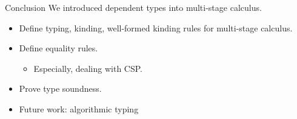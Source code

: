 \documentclass[dvipdfmx,aspectratio=169, 20pt]{beamer}
\renewcommand{\V}{\vdash}
\begin{document}
\begin{frame}[fragile]{Conclusion}
    We introduced dependent types into multi-stage calculus.
    \begin{itemize}
        \item Define typing, kinding, well-formed kinding rules for multi-stage calculus.
        \item Define equality rules.
            \begin{itemize}
                \item Especially, dealing with CSP.
            \end{itemize}
        \item Prove type soundness.
        \item Future work: algorithmic typing
    \end{itemize}
    \note{
    }
\end{frame}


\end{document}
